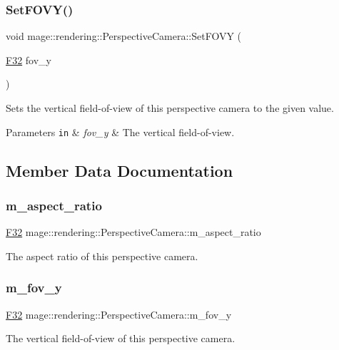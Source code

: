 \subsubsection{\texorpdfstring{Set\+F\+O\+V\+Y()}{SetFOVY()}}
{\footnotesize\ttfamily void mage\+::rendering\+::\+Perspective\+Camera\+::\+Set\+F\+O\+VY (\begin{DoxyParamCaption}\item[{\hyperlink{namespacemage_aa97e833b45f06d60a0a9c4fc22ae02c0}{F32}}]{fov\+\_\+y }\end{DoxyParamCaption})\hspace{0.3cm}{\ttfamily [noexcept]}}

Sets the vertical field-\/of-\/view of this perspective camera to the given value.


\begin{DoxyParams}[1]{Parameters}
\mbox{\tt in}  & {\em fov\+\_\+y} & The vertical field-\/of-\/view. \\
\hline
\end{DoxyParams}


\subsection{Member Data Documentation}
\hypertarget{classmage_1_1rendering_1_1_perspective_camera_a28abd925a9694954dcd26a4c16b6ac6d}{}\label{classmage_1_1rendering_1_1_perspective_camera_a28abd925a9694954dcd26a4c16b6ac6d} 
\subsubsection{\texorpdfstring{m\+\_\+aspect\+\_\+ratio}{m\_aspect\_ratio}}
{\footnotesize\ttfamily \hyperlink{namespacemage_aa97e833b45f06d60a0a9c4fc22ae02c0}{F32} mage\+::rendering\+::\+Perspective\+Camera\+::m\+\_\+aspect\+\_\+ratio\hspace{0.3cm}{\ttfamily [private]}}

The aspect ratio of this perspective camera. \hypertarget{classmage_1_1rendering_1_1_perspective_camera_afa70744921fce139d518730f998bd566}{}\label{classmage_1_1rendering_1_1_perspective_camera_afa70744921fce139d518730f998bd566} 
\subsubsection{\texorpdfstring{m\+\_\+fov\+\_\+y}{m\_fov\_y}}
{\footnotesize\ttfamily \hyperlink{namespacemage_aa97e833b45f06d60a0a9c4fc22ae02c0}{F32} mage\+::rendering\+::\+Perspective\+Camera\+::m\+\_\+fov\+\_\+y\hspace{0.3cm}{\ttfamily [private]}}

The vertical field-\/of-\/view of this perspective camera. 